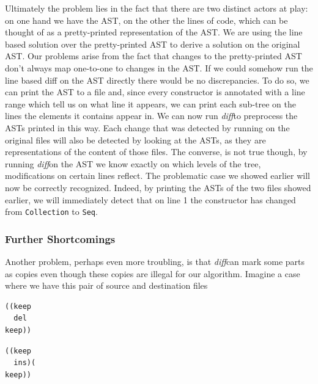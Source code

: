 \documentclass[11pt, titlepage]{article}
\newcommand{\toHaskell}[1]{\texttt{#1}\xspace}
\newcommand{\diff}{\emph{diff}}
\begin{document}
Ultimately the problem lies in the fact that there are two distinct actors at play: on one hand we have the AST, on the other the lines of code, which can be thought of as a pretty-printed representation of the AST. We are using the line based solution over the pretty-printed AST to derive a solution on the original AST. Our problems arise from the fact that changes to the pretty-printed AST don't always map one-to-one to changes in the AST. If we could somehow run the line based diff on the AST directly there would be no discrepancies. To do so, we can print the AST to a file and, since every constructor is annotated with a line range which tell us on what line it appears, we can print each sub-tree on the lines the elements it contains appear in. 
We can now run \diff to preprocess the ASTs printed in this way. Each change that was detected by running on the original files will also be detected by looking at the ASTs, as they are representations of the content of those files. The converse, is not true though, by running \diff on the AST we know exactly on which levels of the tree, modifications on certain lines reflect.
The problematic case we showed earlier will now be correctly recognized. Indeed, by printing the ASTs of the two files showed earlier, we will immediately detect that on line 1 the constructor has changed from \toHaskell{Collection} to \toHaskell{Seq}.

\subsubsection{Further Shortcomings}

Another problem, perhaps even more troubling, is that \diff can mark some parts as copies even though these copies are illegal for our algorithm. 
Imagine a case where we have this pair of source and destination files

\vspace{.6em}
\begin{minipage}{0.5\textwidth}
\begin{verbatim}
((keep
  del
keep))
\end{verbatim}
\end{minipage}
\begin{minipage}{0.5\textwidth}
\begin{verbatim}
((keep
  ins)(
keep))
\end{verbatim}
\end{minipage}
\vspace{.6em}
\end{document}
